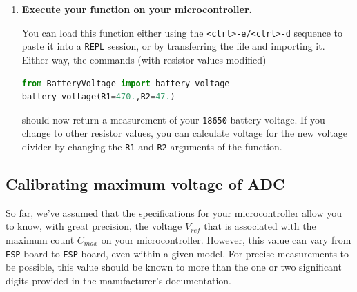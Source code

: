 \begin{enumerate}[resume]
	\item \textbf{Execute your function on your microcontroller.}

	You can load this function either using the \texttt{<ctrl>-e/<ctrl>-d} sequence to paste it into a \texttt{REPL} session, or by transferring the file and importing it.
	Either way, the commands (with resistor values modified)
\begin{lstlisting}[language=Python]
from BatteryVoltage import battery_voltage
battery_voltage(R1=470.,R2=47.)
\end{lstlisting}
	should now return a measurement of your \texttt{\texttt{18650}} battery voltage.
	If you change to other resistor values, you can calculate voltage for the new voltage divider by changing the \texttt{R1} and \texttt{R2} arguments of the function.
\end{enumerate}


%
\newpage

\subsection{Calibrating maximum voltage of ADC}

So far, we've assumed that the specifications for your microcontroller allow you to know, with great precision, the voltage $V_{ref}$ that is associated with the maximum count $C_{max}$ on your microcontroller.
However, this value can vary from \texttt{ESP} board to \texttt{ESP} board, even within a given model.
For precise measurements to be possible, this value should be known to more than the one or two significant digits provided in the manufacturer's documentation.
  
